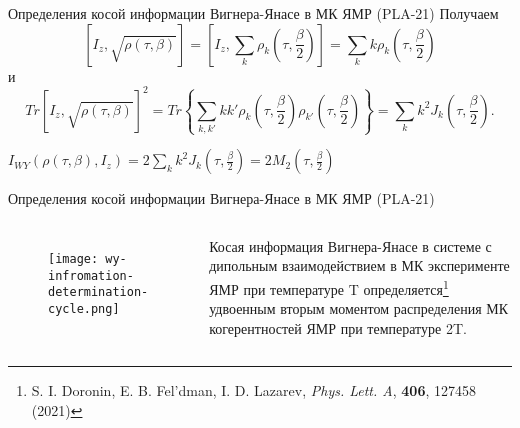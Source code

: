 \begin{frame}{Определения косой информации Вигнера-Янасе в МК ЯМР (PLA-21)}
Получаем
%
$$
    \left[I_z,\sqrt{\rho(\tau,\beta)}\right]
    = \left[I_z, \sum_k \rho_k \left(\tau, \frac{\beta}{2}\right)\right]
    = \sum_k k\rho_k \left(\tau, \frac{\beta}{2}\right)
$$
%
и
%
$$
	Tr\left[I_z,\sqrt{\rho(\tau,\beta)} \right]^2
	= Tr\left\{\sum_{k,k'}kk'
		\rho_k\left(\tau,\frac{\beta}{2}\right)
		\rho_{k'}\left(\tau,\frac{\beta}{2}\right)
	\right\}
	= \sum_k k^2 J_k\left(\tau,\frac{\beta}{2}\right).
$$


\begin{alertblock}{}
\centering
$
  I_{WY}\left(\rho(\tau, \beta), I_z\right)
  = 2\sum_k k^2 J_k\left(\tau, \frac{\beta}{2}\right)
  = 2M_2\left(\tau, \frac{\beta}{2}\right)
$
\end{alertblock}

\end{frame}

\begin{frame}{Определения косой информации Вигнера-Янасе в МК ЯМР (PLA-21)}
  \begin{columns}
  \begin{figure}
    \texttt{[image: wy-infromation-determination-cycle.png]}
  \end{figure}
  Косая информация Вигнера-Янасе в системе с дипольным взаимодействием в МК эксперименте ЯМР при температуре T
  определяется\footnote[frame]{S. I. Doronin, E. B. Fel'dman,  I. D. Lazarev, \textit{Phys. Lett. A}, \textbf{406}, 127458 (2021)}
  удвоенным вторым моментом распределения МК когерентностей ЯМР при температуре 2T.
  \end{columns}
\end{frame}


